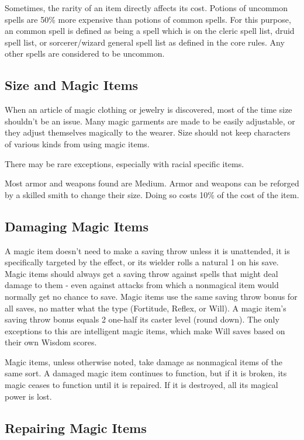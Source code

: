 Sometimes, the rarity of an item directly affects its cost. Potions of uncommon spells are 50\% more expensive than potions of common spells. For this purpose, an common spell is defined as being a spell which is on the cleric spell list, druid spell list, or sorcerer/wizard general spell list as defined in the core rules. Any other spells are considered to be uncommon.

\subsection{Size and Magic Items}

When an article of magic clothing or jewelry is discovered, most of the time size shouldn't be an issue. Many magic garments are made to be easily adjustable, or they adjust themselves magically to the wearer. Size should not keep characters of various kinds from using magic items.

There may be rare exceptions, especially with racial specific items.

 Most armor and weapons found are Medium. Armor and weapons can be reforged by a skilled smith to change their size. Doing so costs 10\% of the cost of the item.

\subsection{Damaging Magic Items}

A magic item doesn't need to make a saving throw unless it is unattended, it is specifically targeted by the effect, or its wielder rolls a natural 1 on his save. Magic items should always get a saving throw against spells that might deal damage to them - even against attacks from which a nonmagical item would normally get no chance to save. Magic items use the same saving throw bonus for all saves, no matter what the type (Fortitude, Reflex, or Will). A magic item's saving throw bonus equals 2 \add one-half its caster level (round down). The only exceptions to this are intelligent magic items, which make Will saves based on their own Wisdom scores.

Magic items, unless otherwise noted, take damage as nonmagical items of the same sort. A damaged magic item continues to function, but if it is broken, its magic ceases to function until it is repaired. If it is destroyed, all its magical power is lost.

\subsection{Repairing Magic Items}

